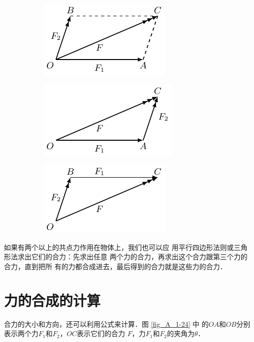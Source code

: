 \begin{figure} [htp]
	\centering
	\begin{subfigure} {1\linewidth} 
		\centering
		\includegraphics{fig/A/1-23a.pdf} 
		\caption{} \label{fig_A_1-23a} 
	\end{subfigure} 
	\begin{subfigure} {0.45\linewidth} 
		\centering
		\includegraphics{fig/A/1-23b.pdf} 
		\caption{} \label{fig_A_1-23b} 
	\end{subfigure} 
	\begin{subfigure} {0.45\linewidth} 
		\centering
		\includegraphics{fig/A/1-23c.pdf} 
		\caption{} \label{fig_A_1-23c} 
	\end{subfigure} 
	\caption{} \label{fig_A_1-23} 
\end{figure} 

    如果有两个以上的共点力作用在物体上，我们也可以应
用平行四边形法则或三角形法求出它们的合力：先求出任意
两个力的合力，再求出这个合力跟第三个力的合力，直到把所
有的力都合成进去，最后得到的合力就是这些力的合力．

\section{力的合成的计算} 
    合力的大小和方向，还可以利用公式来计算．图 \ref{fig_A_1-24} 中
的$OA$和$OB$分别表示两个力$F_1$和$F_2$，$OC$表示它们的合力
$F$，力$F_1$和$F_2$的夹角为$\theta$．

